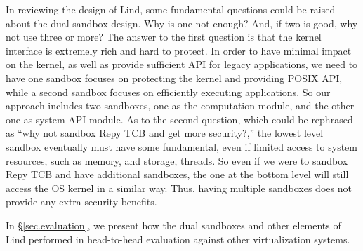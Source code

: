In reviewing the design of Lind, some fundamental questions could be raised about the dual sandbox design. 
Why is one not enough? And, if two is good, why not use three or more? 
The answer to the first question is that the kernel interface is extremely rich and hard to protect. 
In order to have minimal impact on the kernel, as well as provide sufficient API for legacy applications, 
we need to have one sandbox focuses on protecting the kernel and providing POSIX API, 
while a second sandbox focuses on efficiently executing applications. 
So our approach includes two sandboxes, one as the computation module, 
and the other one as system API module. As to the second question, 
which could be rephrased as ``why not sandbox Repy TCB and get more security?,'' 
the lowest level sandbox eventually must have some fundamental, 
even if  limited access to system resources, such as memory, and storage, threads. 
So even if we were to sandbox Repy TCB and have additional sandboxes, 
the one at the bottom level will still access the OS kernel in a similar way. 
Thus, having multiple sandboxes does not provide any extra security benefits. 

In \S{\ref{sec.evaluation}}, we present how the dual sandboxes and other elements of Lind performed in 
head-to-head evaluation against other virtualization systems.
